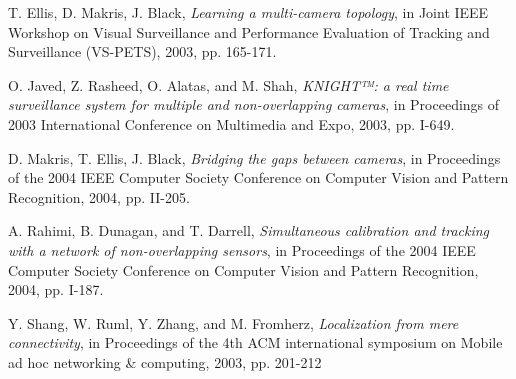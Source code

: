 \documentclass[journal]{IEEEtran}
\begin{document}





%
%
%
\begin{thebibliography}{1}

T. Ellis, D. Makris, J. Black, \emph{Learning a multi-camera topology}, in Joint IEEE Workshop on Visual Surveillance and Performance Evaluation of Tracking and Surveillance (VS-PETS), 2003, pp. 165-171.

O. Javed, Z. Rasheed, O. Alatas, and M. Shah, \emph{KNIGHT™: a real time surveillance system for multiple and non-overlapping cameras}, in Proceedings of 2003 International Conference on Multimedia and Expo, 2003, pp. I-649.

D. Makris, T. Ellis, J. Black, \emph{Bridging the gaps between cameras}, in Proceedings of the 2004 IEEE Computer Society Conference on Computer Vision and Pattern Recognition, 2004, pp. II-205.

A. Rahimi, B. Dunagan, and T. Darrell, \emph{Simultaneous calibration and tracking with a network of non-overlapping sensors}, in Proceedings of the 2004 IEEE Computer Society Conference on Computer Vision and Pattern Recognition, 2004, pp. I-187.

Y. Shang, W. Ruml, Y. Zhang, and M. Fromherz, \emph{Localization from mere connectivity}, in Proceedings of the 4th ACM international symposium on Mobile ad hoc networking \& computing, 2003, pp. 201-212

\end{thebibliography}
\end{document}
